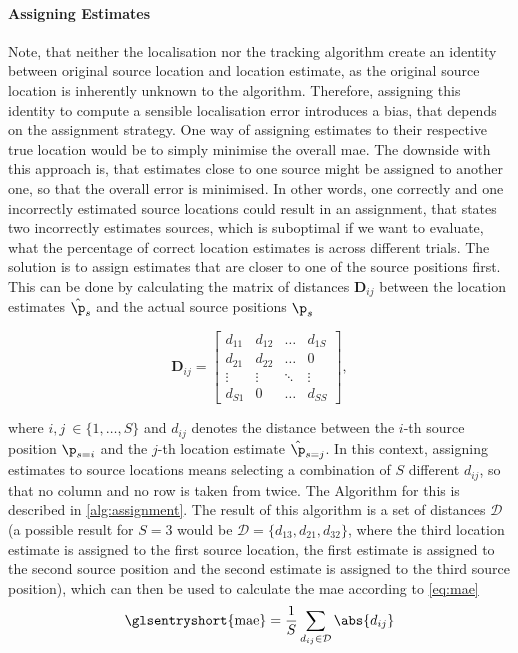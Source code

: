 \paragraph{Assigning Estimates} Note, that neither the localisation nor the tracking algorithm create an identity between original source location and location estimate, as the original source location is inherently unknown to the algorithm. Therefore, assigning this identity to compute a sensible localisation error introduces a bias, that depends on the assignment strategy. One way of assigning estimates to their respective true location would be to simply minimise the overall \gls{mae}. The downside with this approach is, that estimates close to one source might be assigned to another one, so that the overall error is minimised. In other words, one correctly and one incorrectly estimated source locations could result in an assignment, that states two incorrectly estimates sources, which is suboptimal if we want to evaluate, what the percentage of correct location estimates is across different trials. The solution is to assign estimates that are closer to one of the source positions first. This can be done by calculating the matrix of distances $\bm{D}_{ij}$ between the location estimates $\hat\p_s$ and the actual source positions $\p_s$

\begin{equation}
	\bm{D}_{ij}=
	\begin{bmatrix}
		d_{11} & d_{12} & \dots  & d_{1S} \\
		d_{21} & d_{22} & \dots  & 0        \\
		\vdots   & \vdots   & \ddots & \vdots   \\
		d_{S1} & 0        & \dots  & d_{SS}
	\end{bmatrix},
\end{equation}

where $i,j\ \in \{1,\dots,S\}$ and $d_{ij}$ denotes the distance between the $i$-th source position $\p_{s=i}$ and the $j$-th location estimate $\hat\p_{s=j}$. In this context, assigning estimates to source locations means selecting a combination of $S$ different $d_{ij}$, so that no column and no row is taken from twice. The Algorithm for this is described in \autoref{alg:assignment}. The result of this algorithm is a set of distances $\mathcal{D}$ (a possible result for $S=3$ would be $\mathcal{D}=\{d_{13}, d_{21}, d_{32}\}$, where the third location estimate is assigned to the first source location, the first estimate is assigned to the second source position and the second estimate is assigned to the third source position), which can then be used to calculate the \gls{mae} according to \eqref{eq:mae}
\begin{equation}
    \text{\glsentryshort{mae}}=\frac{1}{S}\sum_{d_{ij}\in\mathcal{D}}\abs{d_{ij}}
\end{equation}

